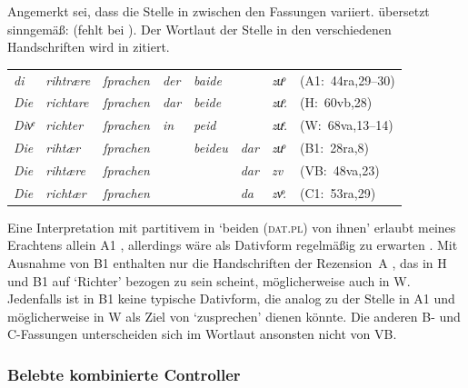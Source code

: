 Angemerkt sei, dass die Stelle in  zwischen den Fassungen
variiert. \citet[244]{myers2013} übersetzt sinngemäß:  (fehlt bei \cite[177--178]{mayer1874}).
Der Wortlaut der Stelle in den verschiedenen Handschriften wird in
 zitiert.

\begin{exe}
\ex \label{ex:gendassgmt2_var}
	\begin{tabular}[t]{
	@{}
	>{\itshape}l @{~}
	>{\itshape}l @{~}
	>{\itshape}l @{~}
	>{\itshape}l @{~}
	>{\itshape}l @{~}
	>{\itshape}l @{~}
	>{\itshape}l
	l
	@{}
}
di
	& rihtrære
	& ſprachen
	& der
	& baide
	& %
	& zuͦ
	& (A1:~44ra,29--30)
	\\

Die
	& richtare
	& ſprachen
	& dar
	& beide
	& %
	& zuͦ.
	& (H:~60vb,28)
	\\

Divͤ
	& richter
	& ſprachen
	& in
	& peid
	& %
	& zuͤ.
	& (W:~68va,13--14)
	\\

Die
	& rihtær
	& ſprachen
	& %
	& beideu
	& dar
	& zuͦ
	& (B1:~28ra,8)
	\\

Die
	& rihtære
	& ſprachen
	& %
	& %
	& dar
	& zv
	& (VB:~48va,23)
	\\

Die
	& richtær
	& ſprachen
	& %
	& %
	& da
	& zvͦ.
	& (C1:~53ra,29)
	\\
\end{tabular}
\end{exe}

Eine Interpretation mit partitivem  in  `beiden
(\textsc{dat.pl}) von ihnen' erlaubt meines Erachtens allein A1
\autocite[vgl.][s.\,v.~\textit{zuo sprëchen}]{lexer:mhdhwb}, allerdings wäre als
Dativform regelmäßig  zu erwarten \autocite[182]{ksw2}. Mit
Ausnahme von B1 enthalten nur die Handschriften der Rezension~A ,
das in H und B1 auf  `Richter' bezogen zu sein scheint,
möglicherweise auch in W. Jedenfalls ist  in B1 keine typische
Dativform, die analog zu der Stelle in A1 und möglicherweise in W als Ziel von
 `zusprechen' dienen könnte. Die anderen B- und C-Fassungen
unterscheiden sich im Wortlaut ansonsten nicht von VB.

\subsubsection{Belebte kombinierte Controller}
\label{subsubsec:x+x_dir_anim}

